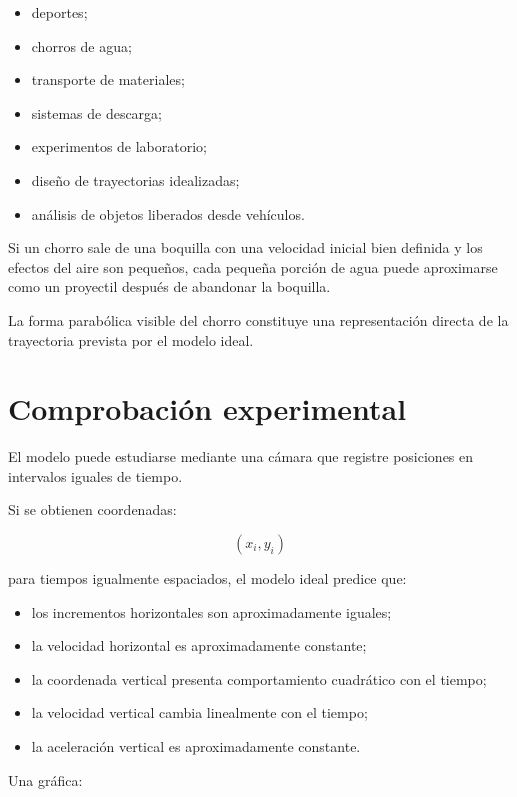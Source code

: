 \begin{itemize}
    \item deportes;
    \item chorros de agua;
    \item transporte de materiales;
    \item sistemas de descarga;
    \item experimentos de laboratorio;
    \item diseño de trayectorias idealizadas;
    \item análisis de objetos liberados desde vehículos.
\end{itemize}

\begin{aplicacion}
Si un chorro sale de una boquilla con una velocidad inicial bien definida y los
efectos del aire son pequeños, cada pequeña porción de agua puede aproximarse
como un proyectil después de abandonar la boquilla.

La forma parabólica visible del chorro constituye una representación directa de
la trayectoria prevista por el modelo ideal.
\end{aplicacion}


\section{Comprobación experimental}

El modelo puede estudiarse mediante una cámara que registre posiciones en
intervalos iguales de tiempo.

Si se obtienen coordenadas:

\[
(x_i,y_i)
\]

para tiempos igualmente espaciados, el modelo ideal predice que:

\begin{itemize}
    \item los incrementos horizontales son aproximadamente iguales;
    \item la velocidad horizontal es aproximadamente constante;
    \item la coordenada vertical presenta comportamiento cuadrático con el tiempo;
    \item la velocidad vertical cambia linealmente con el tiempo;
    \item la aceleración vertical es aproximadamente constante.
\end{itemize}

Una gráfica:

